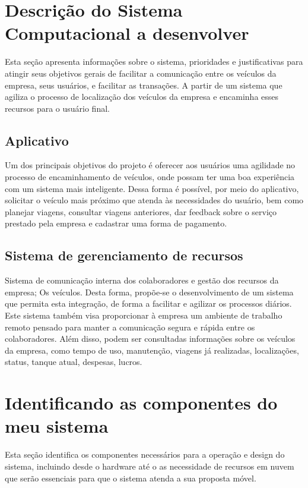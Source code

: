 \section{Descri\c{c}\~{a}o do Sistema Computacional a desenvolver}
Esta seção apresenta informações sobre o sistema, prioridades e justificativas para atingir seus objetivos gerais de facilitar a comunicação entre os veículos da empresa, seus usuários, e facilitar as transações. A partir de um sistema que agiliza o processo de localização dos veículos da empresa e encaminha esses recursos para o usuário final.



\subsection{Aplicativo}

Um dos principais objetivos do projeto é oferecer aos usuários uma agilidade no processo de encaminhamento de veículos, onde possam ter uma boa experiência com um sistema mais inteligente.
Dessa forma é possível, por meio do aplicativo, solicitar o veículo mais próximo que atenda às necessidades do usuário, bem como planejar viagens, consultar viagens anteriores, dar feedback sobre o serviço prestado pela empresa e cadastrar uma forma de pagamento.


\subsection{Sistema de gerenciamento de recursos}

Sistema de comunicação interna dos colaboradores e gestão dos recursos da empresa; Os veículos. Desta forma, propõe-se o desenvolvimento de um sistema que permita esta integração, de forma a facilitar e agilizar os processos diários. Este sistema também visa proporcionar à empresa um ambiente de trabalho remoto pensado para manter a comunicação segura e rápida entre os colaboradores. Além disso, podem ser consultadas informações sobre os veículos da empresa, como tempo de uso, manutenção, viagens já realizadas, localizações, status, tanque atual, despesas, lucros.

\section{Identificando as componentes do meu sistema}

Esta seção identifica os componentes necessários para a operação e design do sistema, incluindo desde o hardware até o as necessidade de recursos em nuvem que serão essenciais para que o sistema atenda a sua proposta móvel.


